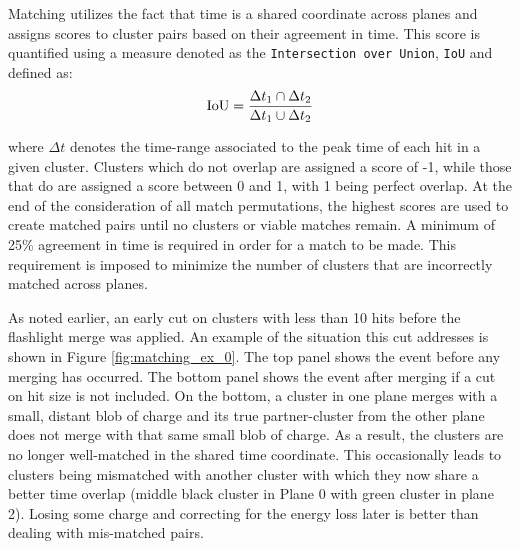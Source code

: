 \par Matching utilizes the fact that time is a shared coordinate across planes and assigns scores to cluster pairs based on their agreement in time. This score is quantified using a measure denoted as the \texttt{Intersection over Union}, \texttt{IoU} and defined as:
\begin{equation}
  {\rm IoU} = \frac{ \Delta t_1 \cap \Delta t_2  }{ \Delta t_1 \cup \Delta t_2 }
\end{equation}

\noindent where $\Delta t$ denotes the time-range associated to the peak time of each hit in a given cluster.  Clusters which do not overlap are assigned a score of -1, while those that do are assigned a score between 0 and 1, with 1 being perfect overlap. At the end of the consideration of all match permutations, the highest scores are used to create matched pairs until no clusters or viable matches remain. A minimum of 25\% agreement in time is required in order for a match to be made.  This requirement is imposed to minimize the number of clusters that are incorrectly matched across planes.  
\par As noted earlier, an early cut on clusters with less than 10 hits before the flashlight merge was applied. An example of the situation this cut addresses is shown in Figure \ref{fig:matching_ex_0}. The top panel shows the event before any merging has occurred. The bottom panel shows the event after merging if a cut on hit size is not included. On the bottom, a cluster in one plane merges with a small, distant blob of charge and its true partner-cluster from the other plane does not merge with that same small blob of charge. As a result, the clusters are no longer well-matched in the shared time coordinate.  This occasionally leads to clusters being mismatched with another cluster with which they now share a better time overlap (middle black cluster in Plane 0 with green cluster in plane 2). Losing some charge and correcting for the energy loss later is better than dealing with mis-matched pairs.

